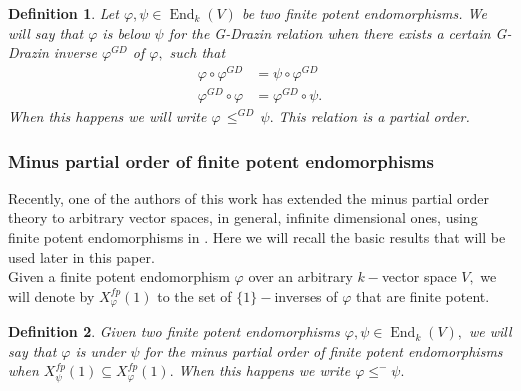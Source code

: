 \documentclass[10pt,a4paper]{amsart}
\newtheorem{defn}{Definition}
\newtheorem{thm}[defn]{Theorem}
\theoremstyle{plain}
\theoremstyle{remark}
\numberwithin{equation}{section} \numberwithin{defn}{section}
\newcommand\ed{\operatorname{End}}
\newcommand{\f}{\varphi}
\newcommand{\g}{\psi}
\begin{document}
\begin{defn}\cite[Definition 6.1, Corollary 6.3, Theorem 6.14]{RendDaa}\label{D: G-Drazin order fp}
Let $\f , \g \in \ed_k(V)$ be two finite potent endomorphisms. We will say that $\f$ is below $\g$ for the G-Drazin relation when there exists a certain G-Drazin inverse $\f^{GD}$ of $\f,$ such that \begin{align*}
\f \circ \f^{GD}& =\g \circ \f^{GD}\\
\f^{GD}\circ \f & =\f^{GD}\circ \g.
\end{align*}
When this happens we will write $\f \, \leq^{GD}\, \g.$ This relation is a partial order.
\end{defn}


\subsubsection{Minus partial order of finite potent endomorphisms}\label{ss: MinusFP}

Recently, one of the authors of this work has extended the minus partial order theory to arbitrary vector spaces, in general, infinite dimensional ones, using finite potent endomorphisms in \cite{MinusDaa}. Here we will recall the basic results that will be used later in this paper.\\
Given a finite potent endomorphism $\f$ over an arbitrary $k-$vector space $V,$ we will denote by $X_{\f}^{fp}(1)$ to the set of $\{1\}-$inverses of $\f$ that are finite potent.

\begin{defn}\cite[Definition 4.1]{MinusDaa} \label{D: Minus FP}
Given two finite potent endomorphisms $\f, \g \in \ed_k(V),$ we will say that $\f$ is under $\g$ for the minus partial order of finite potent endomorphisms when $X_{\g}^{fp}(1)\subseteq X_{\f}^{fp}(1).$	 When this happens we write $\f \leq^{-}\g.$ 
\end{defn}
\end{document}
